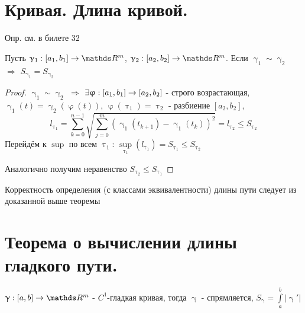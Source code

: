 \documentclass[12pt, fleqn]{article}
\begin{document}
\begin{Property}[3]
\begin{Property}[4]
\begin{Property}[2, аддитивность]
\begin{Proof}
\newpage
\section{Кривая. Длина кривой.}

Опр. см. в билете 32
\begin{theorem} 
    Пусть $\upgamma_1: [a_1,b_1] \rightarrow \R^m$, $\upgamma_2: [a_2,b_2] \rightarrow
    \R^m$. Если $\upgamma_1 \sim \upgamma_2$ $\Rightarrow$ $S_{\upgamma_1} = S_{\upgamma_2}$
\end{theorem}

\begin{proof}
    $\upgamma_1 \sim \upgamma_2$ $\Rightarrow$ $\exists \upvarphi: [a_1, b_1] \rightarrow [a_2, b_2]$ - строго возрастающая, $\upgamma_1(t) = \upgamma_2(\upvarphi(t))$, $\upvarphi(\uptau_1) = \uptau_2$ - разбиение $[a_2,b_2]$, 
    $$l_{\uptau_1} = \sum\limits_{k=0}^{n-1} \sqrt{\sum\limits_{j=0}^m (\upgamma_1(t_{k+1}) - \upgamma_1(t_k))^2} = l_{\uptau_2} \leqslant S_{\uptau_2}$$
    Перейдём к $\sup$ по всем $\uptau_1$: $\sup\limits_{\uptau_1} (l_{\uptau_1}) = S_{\uptau_1} \leqslant S_{\uptau_2}$
    
    Аналогично получим неравенство $S_{\uptau_2} \leqslant S_{\uptau_1}$ 
\end{proof}

\begin{remark}
    Корректность определения (с классами эквивалентности) длины пути следует из доказанной выше теоремы
\end{remark}

\newpage
\section{Теорема о вычислении длины гладкого пути.}
 
\begin{theorem}
    $\upgamma: [a,b] \rightarrow \R^m$ - $C^1$-гладкая кривая, тогда $\upgamma$ - спрямляется, $S_{\upgamma} = \int\limits_a^b |\upgamma'|$
\end{theorem}


\end{Proof}
\end{Property}
\end{Property}
\end{Property}
\end{document}
